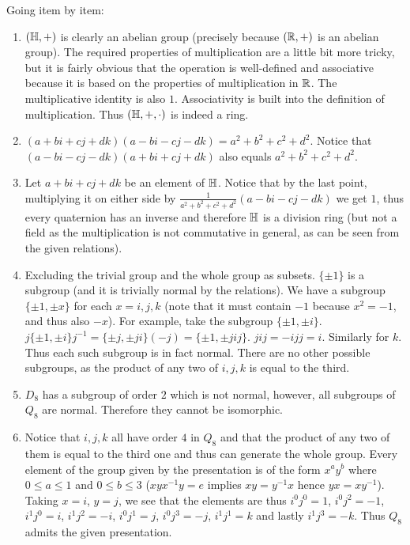 \begin{solution}
	Going item by item:
	\begin{enumerate}[label=(\roman*)]
		\item $(\mathbb{H}, +)$ is clearly an abelian group (precisely because $(\mathbb{R}, +)$ is an abelian group). The required properties of multiplication are a little bit more tricky, but it is fairly obvious that the operation is well-defined and associative because it is based on the properties of multiplication in $\mathbb{R}$. The multiplicative identity is also $1$. Associativity is built into the definition of multiplication. Thus $(\mathbb{H}, +, \cdot)$ is indeed a ring.
		\item $(a+bi+cj+dk)(a-bi-cj-dk) = a^2 + b^2 + c^2 + d^2$. Notice that $(a-bi-cj-dk)(a+bi+cj+dk)$ also equals $a^2 + b^2 + c^2+d^2$.
		\item Let $a+bi+cj+dk$ be an element of $\mathbb{H}$. Notice that by the last point, multiplying it on either side by $\frac{1}{a^2+b^2+c^2+d^2}(a-bi-cj-dk)$ we get $1$, thus every quaternion has an inverse and therefore $\mathbb{H}$ is a division ring (but not a field as the multiplication is not commutative in general, as can be seen from the given relations).
		\item Excluding the trivial group and the whole group as subsets. $\{ \pm 1 \}$ is a subgroup (and it is trivially normal by the relations). We have a subgroup $\{\pm 1, \pm x \}$ for each $x = i, j, k$ (note that it must contain $-1$ because $x^2 = -1$, and thus also $-x$). For example, take the subgroup $\{ \pm 1, \pm i \}$. $j \{ \pm 1, \pm i \} j^{-1} = \{ \pm j, \pm ji \} (-j) = \{ \pm 1, \pm jij \}$. $jij = -ijj = i$. Similarly for $k$. Thus each such subgroup is in fact normal. There are no other possible subgroups, as the product of any two of $i, j, k$ is equal to the third.
		\item $D_8$ has a subgroup of order $2$ which is not normal, however, all subgroups of $Q_8$ are normal. Therefore they cannot be isomorphic.
		\item Notice that $i, j, k$ all have order $4$ in $Q_8$ and that the product of any two of them is equal to the third one and thus can generate the whole group. Every element of the group given by the presentation is of the form $x^a y^b$ where $0 \leq a \leq 1$ and $0 \leq b \leq 3$ ($xyx^{-1}y = e$ implies $xy = y^{-1}x$ hence $yx = xy^{-1}$). Taking $x = i$, $y = j$, we see that the elements are thus $i^0 j^0 = 1$, $i^0 j^2 = -1$, $i^1 j^0 = i$, $i^1 j^2 = -i$, $i^0 j^1 = j$, $i^0 j^3 = -j$, $i^1 j^1 = k$ and lastly $i^1 j^3 = -k$. Thus $Q_8$ admits the given presentation. \qedhere
	\end{enumerate}
\end{solution}

